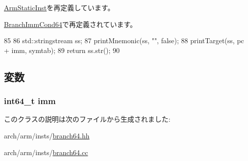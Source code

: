 \hyperlink{classArmISA_1_1ArmStaticInst_a95d323a22a5f07e14d6b4c9385a91896}{ArmStaticInst}を再定義しています。

\hyperlink{classArmISA_1_1BranchImmCond64_a95d323a22a5f07e14d6b4c9385a91896}{BranchImmCond64}で再定義されています。


\begin{DoxyCode}
85 {
86     std::stringstream ss;
87     printMnemonic(ss, "", false);
88     printTarget(ss, pc + imm, symtab);
89     return ss.str();
90 }
\end{DoxyCode}


\subsection{変数}
\hypertarget{classArmISA_1_1BranchImm64_a11b34c3ceec32cc1f14d0ca9c099c470}{
\subsubsection[{imm}]{\setlength{\rightskip}{0pt plus 5cm}int64\_\-t {\bf imm}}}
\label{classArmISA_1_1BranchImm64_a11b34c3ceec32cc1f14d0ca9c099c470}


このクラスの説明は次のファイルから生成されました:\begin{DoxyCompactItemize}
\item 
arch/arm/insts/\hyperlink{branch64_8hh}{branch64.hh}\item 
arch/arm/insts/\hyperlink{branch64_8cc}{branch64.cc}\end{DoxyCompactItemize}

